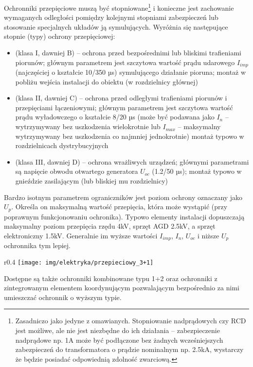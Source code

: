 Ochronniki przepięciowe muszą być stopniowane\footnote{
	Zasadniczo jako jedyne z omawianych.
	Stopniowanie nadprądowych czy RCD jest możliwe, ale nie jest niezbędne do ich działania
		– zabezpieczenie nadprądowe np. 1A może być podłączone bez żadnych wcześniejszych zabezpieczeń do transformatora o prądzie nominalnym np. 2.5kA, wystarczy że będzie posiadać odpowiednią zdolność zwarciową.
} i konieczne jest zachowanie wymaganych odległości pomiędzy kolejnymi stopniami zabezpieczeń lub stosowanie specjalnych układów ją symulujących.
Wyróżnia się następujące stopnie (typy) ochrony przepięciowej:
\begin{itemize}
	\item {} (klasa I, dawniej B)   – ochrona przed bezpośrednimi lub bliskimi trafieniami piorunów;
		głównym parametrem jest szczytowa wartość prądu udarowego $I_{imp}$ (najczęściej o kształcie 10/350 µs) symulującego działanie pioruna;
		montaż w pobliżu wejścia instalacji do obiektu (w rozdzielnicy głównej)
	\item {} (klasa II, dawniej C)  – ochrona przed odległymi trafieniami piorunów i przepięciami łączeniowymi;
		głównym parametrem jest szczytowa wartość prądu wyładowczego o kształcie 8/20 µs (może być podawana jako $I_n$ – wytrzymywany bez uszkodzenia wielokrotnie lub $I_{max}$ – maksymalny wytrzymywany bez uszkodzenia co najmniej jednokrotnie)
		montaż typowo w rozdzielnicach dystrybucyjnych
	\item {} (klasa III, dawniej D) – ochrona wrażliwych urządzeń;
		głównymi parametrami są napięcie obwodu otwartego generatora $U_{oc}$ (1.2/50 µs);
		montaż typowo w gnieździe zasilającym (lub bliskiej mu rozdzielnicy)
\end{itemize}
Bardzo isotnym parametrem ograniczników jest poziom ochrony oznaczany jako $U_p$. Określa on maksymalną wartość przepięcia, która może wystąpić (przy poprawnym funkcjonowaniu ochronika).
Typowo elementy instalacji dopuszczają maksymalny poziom przepięcia rzędu 4kV, sprzęt AGD 2.5kV, a sprzęt elektroniczny 1.5kV.
Generalnie im wyższe wartości $I_{imp}$, $I_n$, $U_{oc}$ i niższe $U_p$ ochronnika tym lepiej.

\begin{wrapfigure}{r}{0.4\textwidth}
\texttt{[image: img/elektryka/przepieciowy\_3+1]}
\end{wrapfigure}

Dostępne są także ochronniki kombinowane typu 1+2 oraz ochronniki z zintegrowanym elementem koordynującym pozwalającym bezpośrednio za nimi umieszczać ochronnik o wyższym typie.

